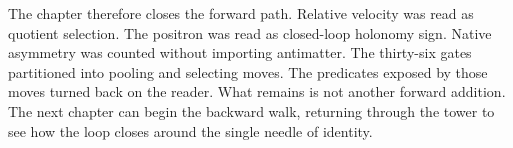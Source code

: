 The chapter therefore closes the forward path. Relative velocity was read as
quotient selection. The positron was read as closed-loop holonomy sign.
Native asymmetry was counted without importing antimatter. The thirty-six
gates partitioned into pooling and selecting moves. The predicates exposed
by those moves turned back on the reader. What remains is not another
forward addition. The next chapter can begin the backward walk, returning
through the tower to see how the loop closes around the single needle of
identity.

